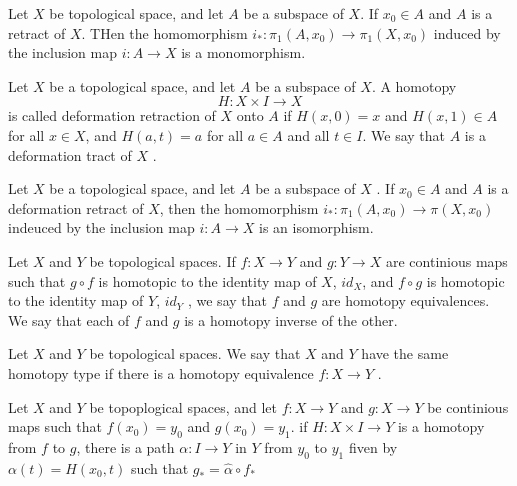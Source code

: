 \documentclass{article}
\theoremstyle{remark}
\begin{document}
\begin{lemma}
    Let $X$ be topological space, and let $A$ be a subspace of $X$. If $x_{0} \in  A$ and $A $ is a retract of $X$. THen
    the homomorphism $i_{* } : \pi  _{1} \left( A, x_{0} \right) \to \pi _{1}\left(X, x_{0}  \right)$ induced by the
    inclusion map $i: A \to X$ is a monomorphism.
\end{lemma}

\begin{definition}
    Let $X$ be a topological space, and let $A$ be a subspace of $X$. A homotopy \[
    H: X \times I \to X
    \]
    is called deformation retraction of $X$  onto $A$  if $H\left( x, 0 \right) = x$ and $H\left( x,1 \right) \in  A$
    for all $x \in X$, and $H\left(  a,t \right) = a$  for all $a \in  A$ and all $t \in  I$. We say that $A$ is a
    deformation tract of $X$ .
\end{definition}

\begin{theorem}
    Let $X$ be a topological space, and let $A$ be a subspace of $X$ . If $x_{0} \in  A$ and $A$ is a deformation
    retract of $X$, then the homomorphism $i_{*}: \pi _{1}\left( A, x_{0} \right) \to \pi \left( X , x_{0} \right)$
    indeuced by the inclusion map $i: A \to X$ is an isomorphism.
\end{theorem}

\begin{definition}
    Let $X$  and $Y$ be topological spaces. If $f: X\to Y$ and $g: Y \to X$ are continious maps such that $g \circ f$ is
    homotopic to the identity map of $X$, $id_{X}$, and $f \circ g$ is homotopic to the identity map of $Y$, $id_{Y}$ ,
    we say that $f$ and $g$  are homotopy equivalences. We say that each of $f$ and $g$  is a homotopy inverse of the
    other.
\end{definition}

\begin{definition}
    Let $X $ and $Y$ be topological spaces. We say that $X$ and $Y$ have the same homotopy type if there is a homotopy
    equivalence $f: X \to Y$ .
\end{definition}

\begin{lemma}
    Let $X$  and $Y$ be topoplogical spaces, and let $f :X \to Y$ and $g: X \to Y$ be continious maps such that $f\left(
    x_{0}\right) =  y_{0}$ and $g\left( x_{0} \right) = y_{1}$. if $H: X \times I \to Y  $ is a homotopy from $f$  to
    $g$, there is a path $\alpha : I \to Y$ in $Y$ from $y_{0}$ to $y_{1}$ fiven by $\alpha \left( t \right) = H\left(
    x_{0}, t \right)$ such that $g _{*} = \hat{\alpha }\circ f_{*}$
\end{lemma}
\end{document}
